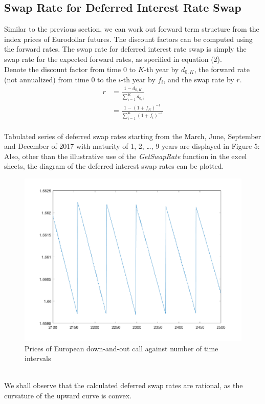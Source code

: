 \subsection{Swap Rate for Deferred Interest Rate Swap}
Similar to the previous section, we can work out forward term structure from the index prices of Eurodollar futures. The discount factors can be computed using the forward rates. The swap rate for deferred interest rate swap is simply the swap rate for the expected forward rates, as specified in equation (2).
\\Denote the discount factor from time 0 to $K$-th year by $d_{0,K}$, the forward rate (not annualized) from time 0 to the $i$-th year by $f_{i}$, and the swap rate by $r$.
\begin{equation}
\begin{split}
r &= \frac{1 - d_{0,K}}{\sum_{i=1}^{K} d_{0,i}}\\
&= \frac{1 - (1 + f_{K})^{-1}}{\sum_{i=1}^{K} (1 + f_{i})^{-1}}
\end{split}
\end{equation}
\\Tabulated series of deferred swap rates starting from the March, June, September and December of 2017 with maturity of 1, 2, \dots, 9 years are displayed in Figure 5:
\\Also, other than the illustrative use of the \emph{GetSwapRate} function in the excel sheets, the diagram of the deferred interest swap rates can be plotted.
\begin{figure}[h]
	\centering
	\includegraphics[scale=0.3]{A1_1_plot2.PNG}
	\caption{Prices of European down-and-out call against number of time intervals}
\end{figure}
\\We shall observe that the calculated deferred swap rates are rational, as the curvature of the upward curve is convex.
\newpage

